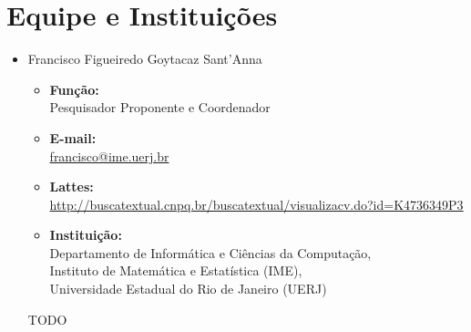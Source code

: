 \documentclass[titlepage,12pt]{article}
\begin{document}
\section{Equipe e Instituições}

\begin{itemize}
    \item Francisco Figueiredo Goytacaz Sant'Anna
    \begin{itemize}
        \item \textbf{Função:} \\
              Pesquisador Proponente e Coordenador
        \item \textbf{E-mail:} \\
              \url{francisco@ime.uerj.br}
        \item \textbf{Lattes:} \\
              {\scriptsize{\url{http://buscatextual.cnpq.br/buscatextual/visualizacv.do?id=K4736349P3}}}
        \item \textbf{Instituição:}                                 \\
              Departamento de Informática e Ciências da Computação, \\
              Instituto de Matemática e Estatística (IME),          \\
              Universidade Estadual do Rio de Janeiro (UERJ)
    \end{itemize}

    TODO
    \begin{comment}
    \item Fabio Mascarenhas de Queiroz
    \begin{itemize}
        \item Função: Professor Colaborador;
        \item Lattes: http://lattes.cnpq.br/2273723591083358; 
        \item Instituição: Universidade Federal do Rio de Janeiro
    \end{itemize}

    \item Gilney de Azevedo Alves Junior
    \begin{itemize}
        \item Função: Colaborador (Aluno de Graduação);
        \item Lattes: http://lattes.cnpq.br/8502686732277287; 
        \item Instituição: Universidade Federal do Rio Grande do Norte
    \end{itemize}
    \end{comment}
\end{itemize}
\end{document}
